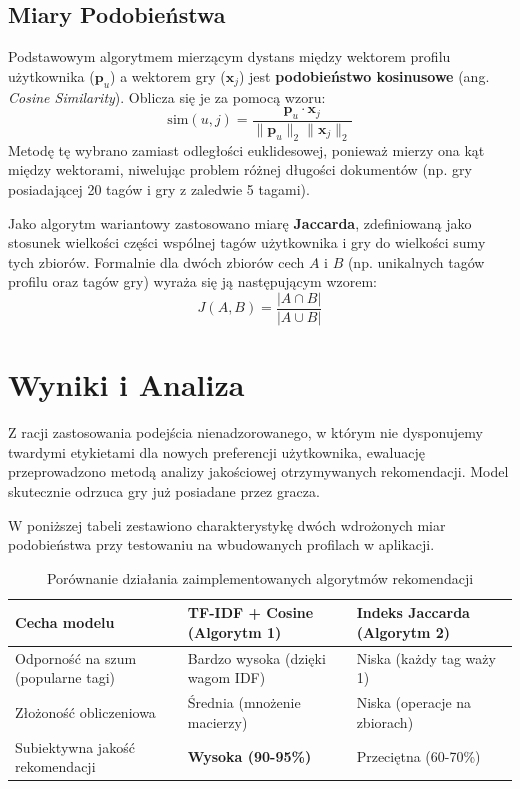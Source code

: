 \documentclass[12pt,a4paper]{article}
\begin{document}
\subsection{Miary Podobieństwa}
Podstawowym algorytmem mierzącym dystans między wektorem profilu użytkownika ($\mathbf{p}_u$) a wektorem gry ($\mathbf{x}_j$) jest \textbf{podobieństwo kosinusowe} (ang. \textit{Cosine Similarity}). Oblicza się je za pomocą wzoru:
\begin{equation}
\mathrm{sim}(u,j) = \frac{\mathbf{p}_u \cdot \mathbf{x}_j}{\|\mathbf{p}_u\|_2\|\mathbf{x}_j\|_2}
\end{equation}
Metodę tę wybrano zamiast odległości euklidesowej, ponieważ mierzy ona kąt między wektorami, niwelując problem różnej długości dokumentów (np. gry posiadającej 20 tagów i gry z zaledwie 5 tagami).

Jako algorytm wariantowy zastosowano miarę \textbf{Jaccarda}, zdefiniowaną jako stosunek wielkości części wspólnej tagów użytkownika i gry do wielkości sumy tych zbiorów. Formalnie dla dwóch zbiorów cech $A$ i $B$ (np. unikalnych tagów profilu oraz tagów gry) wyraża się ją następującym wzorem:
\begin{equation}
J(A,B) = \frac{|A \cap B|}{|A \cup B|}
\end{equation}

\section{Wyniki i Analiza}
Z racji zastosowania podejścia nienadzorowanego, w którym nie dysponujemy twardymi etykietami dla nowych preferencji użytkownika, ewaluację przeprowadzono metodą analizy jakościowej otrzymywanych rekomendacji. Model skutecznie odrzuca gry już posiadane przez gracza.

W poniższej tabeli zestawiono charakterystykę dwóch wdrożonych miar podobieństwa przy testowaniu na wbudowanych profilach w aplikacji.

\begin{table}[h]
\centering
\caption{Porównanie działania zaimplementowanych algorytmów rekomendacji}
\label{tab:wyniki}
\begin{tabular}{ p{4.5cm} p{5cm} p{4.5cm} }
\toprule
\textbf{Cecha modelu} & \textbf{TF-IDF + Cosine} \newline \textbf{(Algorytm 1)} & \textbf{Indeks Jaccarda} \newline \textbf{(Algorytm 2)} \\
\midrule
Odporność na szum (popularne tagi) & Bardzo wysoka \newline (dzięki wagom IDF) & Niska \newline (każdy tag waży 1) \\[1ex]
Złożoność obliczeniowa & Średnia \newline (mnożenie macierzy) & Niska \newline (operacje na zbiorach) \\[1ex]
Subiektywna jakość rekomendacji & \textbf{Wysoka (90-95\%)} & Przeciętna (60-70\%) \\
\bottomrule
\end{tabular}
\end{table}
\end{document}
